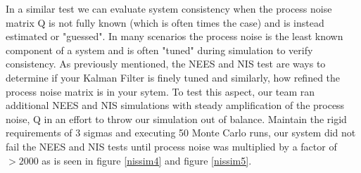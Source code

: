 \documentclass[12pt]{extarticle}
\begin{document}
{{In a similar test we can evaluate system consistency when the process noise matrix Q is not fully known (which is often times the case) and is instead estimated or "guessed".  In many scenarios the process noise is the least known component of a system and is often "tuned" during simulation to verify consistency.  As previously mentioned, the NEES and NIS test are ways to determine if your Kalman Filter is finely tuned and similarly, how refined the process noise matrix is in your sytem.  To test this aspect, our team ran additional NEES and NIS simulations with steady amplification of the process noise, Q in an effort to throw our simulation out of balance.  Maintain the rigid requirements of 3 sigmas and executing 50 Monte Carlo runs, our system did not fail the NEES and NIS tests until process noise was multiplied by a factor of $> 2000$ as is seen in figure \ref{nissim4} and figure \ref{nissim5}.

}}
\end{document}
